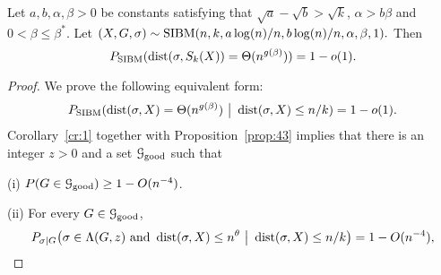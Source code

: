 \documentclass{article}
\begin{document}
\begin{theorem}  \label{thm:dist}
	Let $a,b,\alpha,\beta> 0$ be constants satisfying that
	$\sqrt{a}-\sqrt{b} > \sqrt{k}$, $\alpha>b\beta$ and $0<\beta\le \beta^\ast$.
	Let 
	$
	(X,G,\sigma) \sim \operatorname{SIBM}(n, k, a\log(n)/n, b\log(n)/n, \alpha, \beta, 1) .
	$
	Then
	$$
	P_{\operatorname{SIBM}}(\operatorname{dist}(\sigma, S_k(X)) = \Theta(n^{g(\beta)}) ) = 1-o(1) .
	$$
\end{theorem}
\begin{proof}
	We prove the following equivalent form:
	$$
	P_{\operatorname{SIBM}}(\operatorname{dist}(\sigma, X) = \Theta(n^{g(\beta)}) ~\big|~ \operatorname{dist}(\sigma, X) \le n/k) = 1-o(1) .
	$$
	Corollary~\ref{cr:1} together with Proposition~\ref{prop:43} implies that there is an integer $z>0$ and a set $\mathcal{G}_{\operatorname{good}}$ such that
	
	\noindent (i)
	$P(G\in\mathcal{G}_{\operatorname{good}}) \ge 1- O(n^{-4})$.
	
	\noindent (ii) For every $G\in\mathcal{G}_{\operatorname{good}}$, 
	\begin{equation}  \label{eq:hs}
	P_{\sigma|G} \big( \sigma \in  \Lambda(G, z)
	\text{~and~} \operatorname{dist}(\sigma, X) \le n^\theta ~\big|~ \operatorname{dist}(\sigma, X) \le n/k \big) 
	=1- O(n^{-4}) ,
	\end{equation}


\end{proof}
\end{document}
